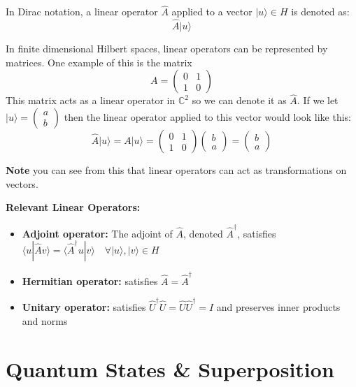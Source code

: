 \noindent In Dirac notation, a linear operator \( \hat{A} \) applied to a vector \( |u\rangle \in H \) is denoted as:
\[
\hat{A}|u\rangle
\]

\noindent In finite dimensional Hilbert spaces, linear operators can be represented by matrices. One example of this is the matrix
\[
A = \begin{pmatrix} 0 & 1 \\ 1 & 0 \end{pmatrix}
\]
This matrix acts as a linear operator in \( \mathbb{C}^2 \) so we can denote it as \( \hat{A} \). If we let \( |u\rangle = \begin{pmatrix} a \\ b \end{pmatrix} \) then the linear operator applied to this vector would look like this:
\[
\hat{A}|u\rangle = A|u\rangle = \begin{pmatrix} 0 & 1 \\ 1 & 0 \end{pmatrix} \begin{pmatrix} b \\ a \end{pmatrix} = \begin{pmatrix} b \\ a \end{pmatrix}
\]

\noindent \textbf{Note} you can see from this that linear operators can act as transformations on vectors.


\noindent \textbf{Relevant Linear Operators:}
\begin{itemize}
    \item \textbf{Adjoint operator:} The adjoint of $\hat{A}$, denoted $\hat{A}^\dagger$, satisfies \(\langle u | \hat{A} v \rangle = \langle \hat{A}^\dagger u | v \rangle \quad \forall |u\rangle, |v\rangle \in H\)
    
    \item \textbf{Hermitian operator:} satisfies \( \hat{A} = \hat{A}^\dagger \) 
    
    \item \textbf{Unitary operator:} satisfies \( \hat{U}^\dagger \hat{U} = \hat{U} \hat{U}^\dagger = I \) and preserves inner products and norms
\end{itemize}


\section{Quantum States \& Superposition}
